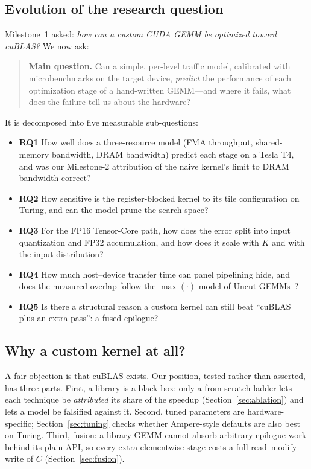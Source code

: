 \documentclass[conference]{IEEEtran}
\begin{document}
\subsection{Evolution of the research question}
Milestone~1 asked: \emph{how can a custom CUDA GEMM be optimized toward cuBLAS?} We now ask:

\begin{quote}
\textbf{Main question.} Can a simple, per-level traffic model, calibrated with microbenchmarks on the target device, \emph{predict} the performance of each optimization stage of a hand-written GEMM---and where it fails, what does the failure tell us about the hardware?
\end{quote}

\noindent It is decomposed into five measurable sub-questions:
\begin{itemize}
\item \textbf{RQ1} How well does a three-resource model (FMA throughput, shared-memory bandwidth, DRAM bandwidth) predict each stage on a Tesla T4, and was our Milestone-2 attribution of the naive kernel's limit to DRAM bandwidth correct?
\item \textbf{RQ2} How sensitive is the register-blocked kernel to its tile configuration on Turing, and can the model prune the search space?
\item \textbf{RQ3} For the FP16 Tensor-Core path, how does the error split into input quantization and FP32 accumulation, and how does it scale with $K$ and with the input distribution?
\item \textbf{RQ4} How much host--device transfer time can panel pipelining hide, and does the measured overlap follow the $\max(\cdot)$ model of Uncut-GEMMs~\cite{uncut}?
\item \textbf{RQ5} Is there a structural reason a custom kernel can still beat ``cuBLAS plus an extra pass'': a fused epilogue?
\end{itemize}

\subsection{Why a custom kernel at all?}
A fair objection is that cuBLAS exists. Our position, tested rather than asserted, has three parts. First, a library is a black box: only a from-scratch ladder lets each technique be \emph{attributed} its share of the speedup (Section~\ref{sec:ablation}) and lets a model be falsified against it. Second, tuned parameters are hardware-specific; Section~\ref{sec:tuning} checks whether Ampere-style defaults are also best on Turing. Third, fusion: a library GEMM cannot absorb arbitrary epilogue work behind its plain API, so every extra elementwise stage costs a full read--modify--write of $C$ (Section~\ref{sec:fusion}).
\end{document}
